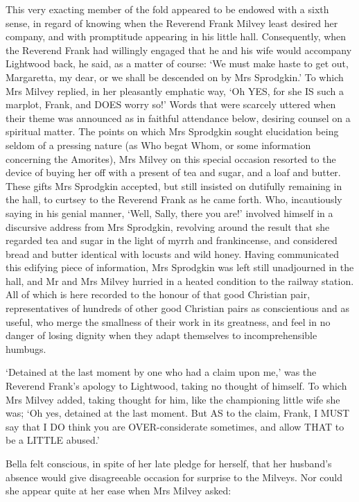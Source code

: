 This very exacting member of the fold appeared to be endowed with a
sixth sense, in regard of knowing when the Reverend Frank Milvey least
desired her company, and with promptitude appearing in his little hall.
Consequently, when the Reverend Frank had willingly engaged that he and
his wife would accompany Lightwood back, he said, as a matter of course:
‘We must make haste to get out, Margaretta, my dear, or we shall be
descended on by Mrs Sprodgkin.’ To which Mrs Milvey replied, in her
pleasantly emphatic way, ‘Oh YES, for she IS such a marplot, Frank, and
DOES worry so!’ Words that were scarcely uttered when their theme
was announced as in faithful attendance below, desiring counsel on a
spiritual matter. The points on which Mrs Sprodgkin sought elucidation
being seldom of a pressing nature (as Who begat Whom, or some
information concerning the Amorites), Mrs Milvey on this special
occasion resorted to the device of buying her off with a present of tea
and sugar, and a loaf and butter. These gifts Mrs Sprodgkin accepted,
but still insisted on dutifully remaining in the hall, to curtsey to the
Reverend Frank as he came forth. Who, incautiously saying in his genial
manner, ‘Well, Sally, there you are!’ involved himself in a discursive
address from Mrs Sprodgkin, revolving around the result that she
regarded tea and sugar in the light of myrrh and frankincense, and
considered bread and butter identical with locusts and wild honey.
Having communicated this edifying piece of information, Mrs Sprodgkin
was left still unadjourned in the hall, and Mr and Mrs Milvey hurried in
a heated condition to the railway station. All of which is here recorded
to the honour of that good Christian pair, representatives of hundreds
of other good Christian pairs as conscientious and as useful, who merge
the smallness of their work in its greatness, and feel in no danger of
losing dignity when they adapt themselves to incomprehensible humbugs.

‘Detained at the last moment by one who had a claim upon me,’ was the
Reverend Frank’s apology to Lightwood, taking no thought of himself.
To which Mrs Milvey added, taking thought for him, like the championing
little wife she was; ‘Oh yes, detained at the last moment. But AS to
the claim, Frank, I MUST say that I DO think you are OVER-considerate
sometimes, and allow THAT to be a LITTLE abused.’

Bella felt conscious, in spite of her late pledge for herself, that her
husband’s absence would give disagreeable occasion for surprise to the
Milveys. Nor could she appear quite at her ease when Mrs Milvey asked:

